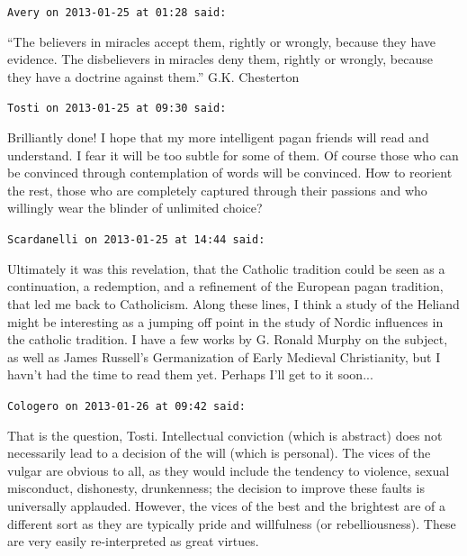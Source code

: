 \begin{footnotesize}
\begin{sffamily}
\texttt{Avery on 2013-01-25 at 01:28 said:}

``The believers in miracles accept them, rightly or wrongly, because they have evidence. The disbelievers in miracles deny them, rightly or wrongly, because they have a doctrine against them.'' G.K. Chesterton

\hfill

\texttt{Tosti on 2013-01-25 at 09:30 said:}

Brilliantly done! I hope that my more intelligent pagan friends will read and understand. I fear it will be too subtle for some of them. Of course those who can be convinced through contemplation of words will be convinced. How to reorient the rest, those who are completely captured through their passions and who willingly wear the blinder of unlimited choice?

\hfill

\texttt{Scardanelli on 2013-01-25 at 14:44 said:}

Ultimately it was this revelation, that the Catholic tradition could be seen as a continuation, a redemption, and a refinement of the European pagan tradition, that led me back to Catholicism. Along these lines, I think a study of the Heliand might be interesting as a jumping off point in the study of Nordic influences in the catholic tradition. I have a few works by G. Ronald Murphy on the subject, as well as James Russell's Germanization of Early Medieval Christianity, but I havn't had the time to read them yet. Perhaps I'll get to it soon... 

\hfill

\texttt{Cologero on 2013-01-26 at 09:42 said:}

That is the question, Tosti. Intellectual conviction (which is abstract) does not necessarily lead to a decision of the will (which is personal). The vices of the vulgar are obvious to all, as they would include the tendency to violence, sexual misconduct, dishonesty, drunkenness; the decision to improve these faults is universally applauded. However, the vices of the best and the brightest are of a different sort as they are typically pride and willfulness (or rebelliousness). These are very easily re-interpreted as great virtues.


\hfill

\end{sffamily}
\end{footnotesize}


